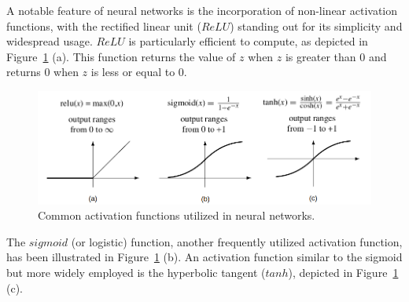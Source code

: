 A notable feature of neural networks is the incorporation of non-linear activation functions, with the rectified linear unit ($ReLU$) standing out for its simplicity and widespread usage. 
$ReLU$ is particularly efficient to compute, as depicted in Figure~\ref{fig:relu} (a). 
This function returns the value of $z$ when $z$ is greater than 0 and returns $0$ when $z$ is less or equal to 0.
\begin{figure}[h]
	\centering
	\includegraphics[width=0.7\linewidth]{Figures/Relu}
	\caption{Common activation functions utilized in neural networks.}
	\label{fig:relu}
\end{figure}
The $sigmoid$ (or logistic) function, another frequently utilized activation function, has been illustrated in Figure~\ref{fig:relu} (b).
An activation function similar to the sigmoid but more widely employed is the hyperbolic tangent ($tanh$), depicted in Figure~\ref{fig:relu} (c).

